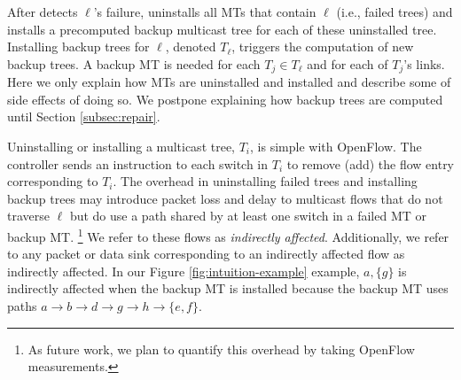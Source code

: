 After \fl detects $\ell$'s failure, \mdr uninstalls all MTs that contain $\ell$ (i.e., failed trees) and installs a precomputed backup multicast tree for each of these uninstalled tree. Installing 
backup trees for $\ell$, denoted $T_{\ell}$, triggers the computation of new backup trees.  A backup MT is needed for each $T_j \in T_{\ell}$ and for each of $T_j$'s links.
Here we only explain how MTs are uninstalled and installed and describe some of side effects of doing so. We postpone explaining how backup trees are computed until Section \ref{subsec:repair}.

Uninstalling or installing a multicast tree, $T_i$, is simple with OpenFlow.  The controller sends an instruction to each switch in $T_i$ to remove (add) the flow entry corresponding to $T_i$.
The overhead in uninstalling failed trees and installing backup trees may introduce packet loss and delay to multicast flows that do not traverse $\ell$ but do use a path shared by at least one switch in a failed MT or backup MT.  
\footnote{As future work, we plan to quantify this overhead by taking OpenFlow measurements. }
We refer to these flows as \emph{indirectly affected}. Additionally, we refer to any packet or data sink corresponding to an indirectly affected flow as indirectly affected.
In our Figure \ref{fig:intuition-example} example, $a,\{g\}$ is indirectly affected when the backup MT is installed because the backup MT uses paths 
$a \rightarrow b \rightarrow d \rightarrow g \rightarrow h \rightarrow \{e,f\}$. 











